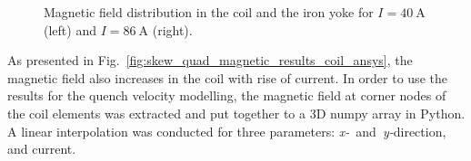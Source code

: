 \begin{figure}[H]
    \centering
    \caption{Magnetic field distribution in the coil and the iron yoke for $I=40~\text{A}$ (left) and $I=86~\text{A}$ (right).}
    \label{fig:skew_quad_magnetic_results_geometry_ansys}
\end{figure}

As presented in Fig.~\ref{fig:skew_quad_magnetic_results_coil_ansys}, the magnetic field also increases in the coil with rise of current. In order to use the results for the quench velocity modelling, the magnetic field at corner nodes of the coil elements was extracted and put together to a 3D numpy array in Python. A linear interpolation was conducted for three parameters: \textit{x-}~and~\textit{y-}direction, and current.

